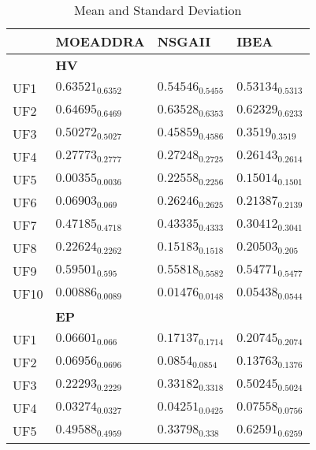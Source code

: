 \documentclass{article}
\begin{document}
\begin{table}[!h]
\caption{Mean and Standard Deviation}
\label{Table:meanAndStDev.all}
\centering
\begin{scriptsize}
\begin{tabular}{llll}
\hline & MOEADDRA & NSGAII & IBEA\\
\hline 
& \textbf{\small HV}\\
\hline 
UF1 & \cellcolor{gray95}$0.63521_{0.6352}$ & \cellcolor{gray25}$0.54546_{0.5455}$ & $0.53134_{0.5313}$ \\
UF2 & \cellcolor{gray95}$0.64695_{0.6469}$ & \cellcolor{gray25}$0.63528_{0.6353}$ & $0.62329_{0.6233}$ \\
UF3 & \cellcolor{gray95}$0.50272_{0.5027}$ & \cellcolor{gray25}$0.45859_{0.4586}$ & $0.3519_{0.3519}$ \\
UF4 & \cellcolor{gray95}$0.27773_{0.2777}$ & \cellcolor{gray25}$0.27248_{0.2725}$ & $0.26143_{0.2614}$ \\
UF5 & $0.00355_{0.0036}$ & \cellcolor{gray95}$0.22558_{0.2256}$ & \cellcolor{gray25}$0.15014_{0.1501}$ \\
UF6 & $0.06903_{0.069}$ & \cellcolor{gray95}$0.26246_{0.2625}$ & \cellcolor{gray25}$0.21387_{0.2139}$ \\
UF7 & \cellcolor{gray95}$0.47185_{0.4718}$ & \cellcolor{gray25}$0.43335_{0.4333}$ & $0.30412_{0.3041}$ \\
UF8 & \cellcolor{gray95}$0.22624_{0.2262}$ & $0.15183_{0.1518}$ & \cellcolor{gray25}$0.20503_{0.205}$ \\
UF9 & \cellcolor{gray95}$0.59501_{0.595}$ & \cellcolor{gray25}$0.55818_{0.5582}$ & $0.54771_{0.5477}$ \\
UF10 & $0.00886_{0.0089}$ & \cellcolor{gray25}$0.01476_{0.0148}$ & \cellcolor{gray95}$0.05438_{0.0544}$ \\
\hline
& \textbf{\small EP}\\
\hline 
UF1 & \cellcolor{gray95}$0.06601_{0.066}$ & \cellcolor{gray25}$0.17137_{0.1714}$ & $0.20745_{0.2074}$ \\
UF2 & \cellcolor{gray95}$0.06956_{0.0696}$ & \cellcolor{gray25}$0.0854_{0.0854}$ & $0.13763_{0.1376}$ \\
UF3 & \cellcolor{gray95}$0.22293_{0.2229}$ & \cellcolor{gray25}$0.33182_{0.3318}$ & $0.50245_{0.5024}$ \\
UF4 & \cellcolor{gray95}$0.03274_{0.0327}$ & \cellcolor{gray25}$0.04251_{0.0425}$ & $0.07558_{0.0756}$ \\
UF5 & \cellcolor{gray25}$0.49588_{0.4959}$ & \cellcolor{gray95}$0.33798_{0.338}$ & $0.62591_{0.6259}$ \\

\end{tabular}
\end{scriptsize}
\end{table}
\end{document}
